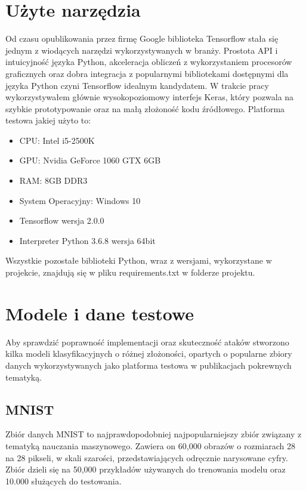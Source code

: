 \documentclass{article}
\begin{document}
\section{Użyte narzędzia}
Od czasu opublikowania przez firmę Google biblioteka Tensorflow 
stała się jednym z wiodących narzędzi wykorzystywanych w branży. Prostota API i intuicyjność
języka Python, akceleracja obliczeń z wykorzystaniem procesorów graficznych oraz dobra integracja z
popularnymi bibliotekami dostępnymi dla języka Python czyni Tensorflow idealnym kandydatem.
W trakcie pracy wykorzystywałem głównie wysokopoziomowy interfejs Keras, który pozwala na szybkie
prototypowanie oraz na małą złożoność kodu źródłowego.
Platforma testowa jakiej użyto to:
\begin{itemize}
    \item CPU: Intel i5-2500K
    \item GPU: Nvidia GeForce 1060 GTX 6GB
    \item RAM: 8GB DDR3
    \item System Operacyjny: Windows 10
    \item Tensorflow wersja 2.0.0
    \item Interpreter Python 3.6.8 wersja 64bit
\end{itemize}
Wszystkie pozostałe biblioteki Python, wraz z wersjami, wykorzystane w projekcie, znajdują się w pliku
requirements.txt w folderze projektu.

\section{Modele i dane testowe}
Aby sprawdzić poprawność implementacji oraz skuteczność ataków stworzono
kilka modeli klasyfikacyjnych o różnej złożoności, opartych o popularne zbiory danych
wykorzystywanych jako platforma testowa w publikacjach pokrewnych tematyką.

    \subsection{MNIST}
    Zbiór danych MNIST \cite{mnist} to najprawdopodobniej najpopularniejszy zbiór związany z
    tematyką nauczania maszynowego.
    Zawiera on 60,000 obrazów o rozmiarach 28 na 28 pikseli, w skali szarości, przedstawiających
    odręcznie narysowane cyfry. Zbiór dzieli się na 50,000 przykładów używanych do
    trenowania modelu oraz 10.000 służących do testowania.
\end{document}
